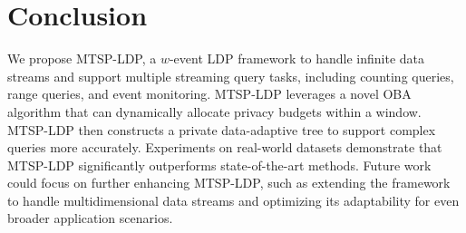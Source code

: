 \section{Conclusion} \label{sec:conclusions}

We propose MTSP-LDP, a $w$-event LDP framework to handle infinite data streams
and support multiple streaming query tasks, including counting queries, range
queries, and event monitoring.
MTSP-LDP leverages a novel OBA algorithm that can dynamically allocate privacy
budgets within a window.
MTSP-LDP then constructs a private data-adaptive tree to support complex queries
more accurately.
Experiments on real-world datasets demonstrate that MTSP-LDP significantly
outperforms state-of-the-art methods.
Future work could focus on further enhancing MTSP-LDP, such as extending the
framework to handle multidimensional data streams and optimizing its
adaptability for even broader application scenarios.